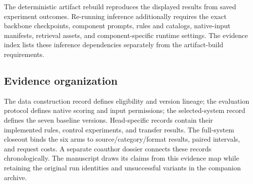 The deterministic artifact rebuild reproduces the displayed results from saved experiment outcomes. Re-running inference additionally requires the exact backbone checkpoints, component prompts, rules and catalogs, native-input manifests, retrieval assets, and component-specific runtime settings. The evidence index lists these inference dependencies separately from the artifact-build requirements.

\subsection{Evidence organization}
The data construction record defines eligibility and version lineage; the evaluation protocol defines native scoring and input permissions; the selected-system record defines the seven baseline versions. Head-specific records contain their implemented rules, control experiments, and transfer results. The full-system closeout binds the six arms to source/category/format results, paired intervals, and request costs. A separate coauthor dossier connects these records chronologically. The manuscript draws its claims from this evidence map while retaining the original run identities and unsuccessful variants in the companion archive.
\FloatBarrier
